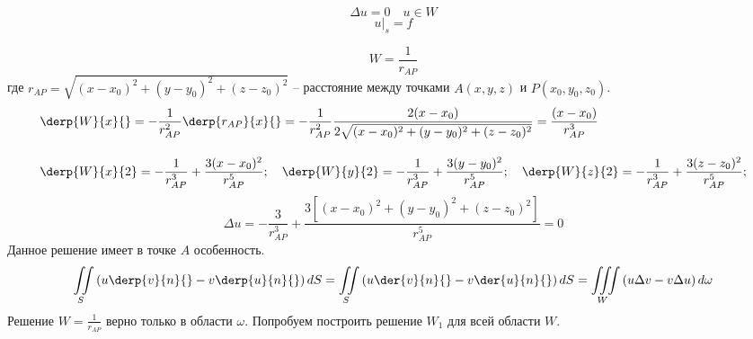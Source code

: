 \[
	\Delta u = 0 \quad u \in W
\]
\[
	u|_s = f
\]

\[
	W = \frac{1}{r_{AP}}
\]
где $
	r_{AP} = \sqrt{(x - x_0)^2 + (y - y_0)^2 + (z - z_0)^2}
$
-- расстояние между точками $A(x, y, z)$ и $P (x_0, y_0, z_0)$.
\begin{align*}
	 &\derp{W}{x}{} = - \frac{1}{r_{AP}^2} \derp{r_{AP}}{x}{} = - \frac{1}{r_{AP}^2} \frac{2 (x - x_0)}{2 \sqrt{(x - x_0)^2 + (y - y_0)^2 + (z - z_0)^2}} = \frac{(x - x_0)}{r_{AP}^3}\\[10pt]
	&\derp{W}{x}{2} = - \frac{1}{r_{AP}^3} + \frac{3 (x - x_0)^2}{r_{AP}^5}; \quad \derp{W}{y}{2} = - \frac{1}{r_{AP}^3} + \frac{3 (y - y_0)^2}{r_{AP}^5}; \quad \derp{W}{z}{2} = - \frac{1}{r_{AP}^3} + \frac{3 (z - z_0)^2}{r_{AP}^5}; 
\end{align*}
\[
	\Delta u = - \frac{3}{r_{AP}^3} + \frac{3 [(x - x_0)^2 + (y - y_0)^2 + (z - z_0)^2]}{r_{AP}^5} = 0
\]
		Данное решение имеет в точке $A$ особенность.\\
\[
	\iint\limits_{S} \left(u \derp{v}{n}{} - v \derp{u}{n}{}\right) dS = \iint\limits_S \left(u \der{v}{n}{} - v \der{u}{n}{}\right) dS = \iiint\limits_{W} \left(u \Delta v - v \Delta u \right) d \omega
\]
		Решение $W = \frac{1}{r_{AP}}$ верно только в области $\omega$. Попробуем построить решение $W_1$ для всей области $W$.\\
		
